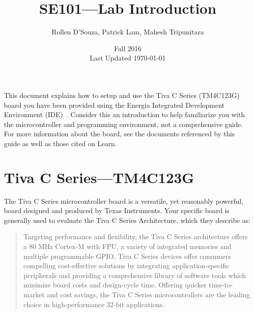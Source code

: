 \documentclass{article}
\begin{document}
\title{SE101---Lab Introduction}
\author{Rollen D'Souza, Patrick Lam, Mahesh Tripunitara}
\date{Fall 2016\\Last Updated \today}
\maketitle

This document explains how to setup and use the Tiva C Series (TM4C123G) board you have been provided using the Energia Integrated Development Environment (IDE)~\cite{tivaBoard}. Consider this an introduction to help familiarize you with the microcontroller and programming environment, not a comprehensive guide.  For more information about the board, see the documents referenced by this guide as well as those cited on Learn.

\section*{Tiva C Series---TM4C123G}
The Tiva C Series microcontroller board is a versatile, yet reasonably powerful, board designed and produced by Texas Instruments.  Your specific board is generally used to evaluate the Tiva C Series Architecture, which they describe as:
\begin{quotation}
Targeting performance and flexibility, the Tiva C Series architecture offers a 80 MHz Cortex-M with FPU, a variety of integrated memories and multiple programmable GPIO. Tiva C Series devices offer consumers compelling cost-effective solutions by integrating application-specific peripherals and providing a comprehensive library of software tools which minimize board costs and design-cycle time. Offering quicker time-to-market and cost savings, the Tiva C Series microcontrollers are the leading choice in high-performance 32-bit applications.~\cite{tivaArch}
\end{quotation}
\end{document}
